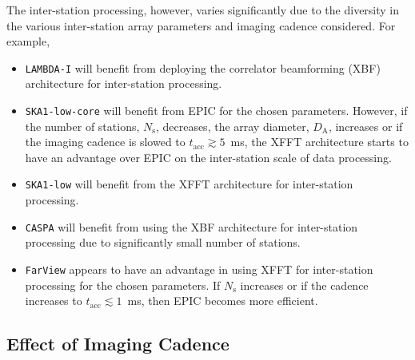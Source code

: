 \documentclass[
  journal=pasa,
  manuscript=article-type,
  year=2020,
  volume=37,
]{cup-journal}
\begin{document}
The inter-station processing, however, varies significantly due to the diversity in the various inter-station array parameters and imaging cadence considered. For example, 
\begin{itemize}
    \item \texttt{LAMBDA-I} will benefit from deploying the correlator beamforming (XBF) architecture for inter-station processing. 
    \item \texttt{SKA1-low-core} will benefit from EPIC for the chosen parameters. However, if the number of stations, $N_\textrm{s}$, decreases,  the array diameter, $D_\textrm{A}$, increases or if the imaging cadence is slowed to $t_\textrm{acc} \gtrsim 5$~ms, the XFFT architecture starts to have an advantage over EPIC on the inter-station scale of data processing. 
    \item \texttt{SKA1-low} will benefit from the XFFT architecture for inter-station processing.
    \item \texttt{CASPA} will benefit from using the XBF architecture for inter-station processing due to significantly small number of stations.
    \item \texttt{FarView} appears to have an advantage in using XFFT for inter-station processing for the chosen parameters. If $N_\textrm{s}$ increases or if the cadence increases to $t_\textrm{acc}\lesssim 1$~ms, then EPIC becomes more efficient. 
\end{itemize}

\subsection{Effect of Imaging Cadence}\label{sec:cadence}
\end{document}

